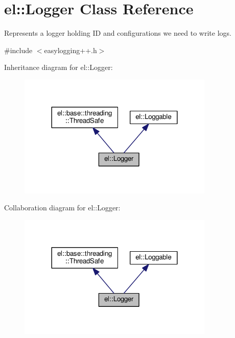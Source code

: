 \hypertarget{classel_1_1_logger}{}\section{el\+:\+:Logger Class Reference}
\label{classel_1_1_logger}


Represents a logger holding ID and configurations we need to write logs.  




{\ttfamily \#include $<$easylogging++.\+h$>$}



Inheritance diagram for el\+:\+:Logger\+:
\nopagebreak
\begin{figure}[H]
\begin{center}
\leavevmode
\includegraphics[width=264pt]{classel_1_1_logger__inherit__graph}
\end{center}
\end{figure}


Collaboration diagram for el\+:\+:Logger\+:
\nopagebreak
\begin{figure}[H]
\begin{center}
\leavevmode
\includegraphics[width=264pt]{classel_1_1_logger__coll__graph}
\end{center}
\end{figure}
